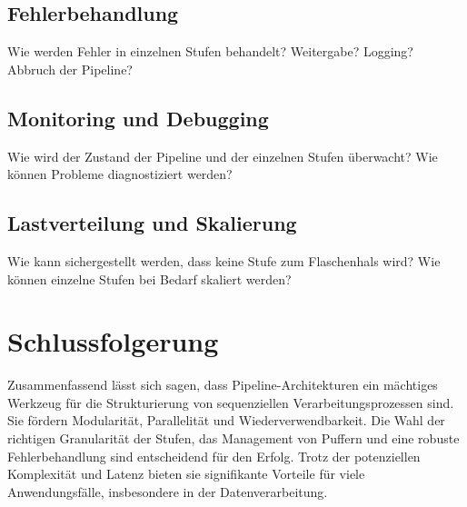 \documentclass[a4paper]{article} %
\begin{document}
\subsection{Fehlerbehandlung}
Wie werden Fehler in einzelnen Stufen behandelt? Weitergabe? Logging? Abbruch der Pipeline?
\lipsum[19-21]

\subsection{Monitoring und Debugging}
Wie wird der Zustand der Pipeline und der einzelnen Stufen überwacht? Wie können Probleme diagnostiziert werden?
\blindtext[3]
\lipsum[22]

\subsection{Lastverteilung und Skalierung}
Wie kann sichergestellt werden, dass keine Stufe zum Flaschenhals wird? Wie können einzelne Stufen bei Bedarf skaliert werden?
\lipsum[23-25]
\blindtext[2]


\section{Schlussfolgerung}
Zusammenfassend lässt sich sagen, dass Pipeline-Architekturen ein mächtiges Werkzeug für die Strukturierung von sequenziellen Verarbeitungsprozessen sind. Sie fördern Modularität, Parallelität und Wiederverwendbarkeit. Die Wahl der richtigen Granularität der Stufen, das Management von Puffern und eine robuste Fehlerbehandlung sind entscheidend für den Erfolg. Trotz der potenziellen Komplexität und Latenz bieten sie signifikante Vorteile für viele Anwendungsfälle, insbesondere in der Datenverarbeitung.
\lipsum[26-28]
\blindtext
\end{document}
